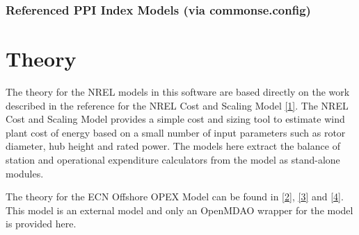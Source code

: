 \documentclass[letterpaper,10pt,openany,oneside]{sphinxmanual}
\begin{document}
\begin{fulllineitems}
\label{documentation:commonse.xcel_wrapper.ExcelWrapper}
\end{fulllineitems}



\subsection{Referenced PPI Index Models (via commonse.config)}
\label{documentation:id3}\label{documentation:module-commonse.csmPPI}

\begin{fulllineitems}
\end{fulllineitems}



\chapter{Theory}
\label{theory::doc}\label{theory:theory}\label{theory:id1}
The theory for the NREL models in this software are based directly on the work described in the reference for the NREL Cost and Scaling Model {\hyperref[theory:fingersh2006]{{[}1{]}}}.  The NREL Cost and Scaling Model provides a simple cost and sizing tool to estimate wind plant cost of energy based on a small number of input parameters such as rotor diameter, hub height and rated power.  The models here extract the balance of station and operational expenditure calculators from the model as stand-alone modules.

The theory for the ECN Offshore OPEX Model can be found in {\hyperref[theory:ecn2012]{{[}2{]}}}, {\hyperref[theory:obdam2011a]{{[}3{]}}} and {\hyperref[theory:obdam2011b]{{[}4{]}}}.  This model is an external model and only an OpenMDAO wrapper for the model is provided here.
\end{document}
